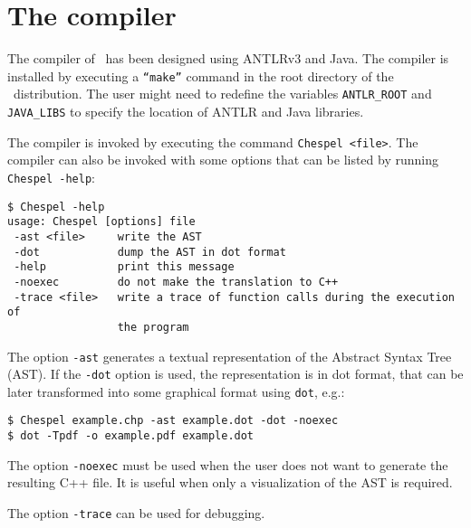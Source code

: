\section{The compiler}

The compiler of \Chespel\ has been designed using ANTLRv3 and Java.
The compiler is installed by executing a \texttt{``make''} command
in the root directory of the \Chespel\ distribution. The user might need to
redefine the variables \texttt{ANTLR\_ROOT} and \texttt{JAVA\_LIBS}
to specify the location of ANTLR and Java libraries.

The compiler is invoked by executing the command \texttt{Chespel <file>}.
The compiler can also be invoked with some options that can be
listed by running \texttt{Chespel -help}:

\begin{verbatim}
$ Chespel -help
usage: Chespel [options] file
 -ast <file>     write the AST
 -dot            dump the AST in dot format
 -help           print this message
 -noexec         do not make the translation to C++
 -trace <file>   write a trace of function calls during the execution of
                 the program
\end{verbatim}

The option \texttt{-ast} generates a textual representation of the Abstract
Syntax Tree (AST). If the \texttt{-dot} option is used, the
representation is in dot format, that can be later transformed into
some graphical format using \texttt{dot}, e.g.:

\begin{verbatim}
$ Chespel example.chp -ast example.dot -dot -noexec
$ dot -Tpdf -o example.pdf example.dot
\end{verbatim}

The option \texttt{-noexec} must be used when the user does not want
to generate the resulting C++ file. It is useful when only a visualization of the AST is
required.



The option \texttt{-trace} can be used for debugging.

